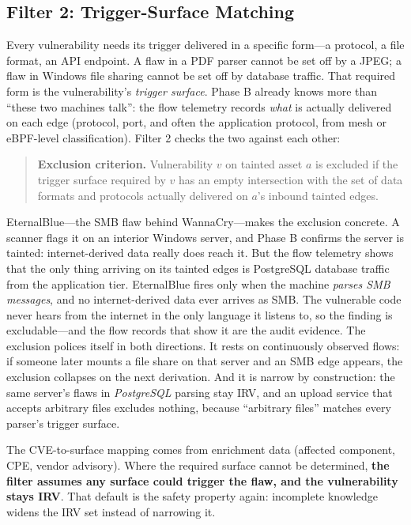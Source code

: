 \documentclass[11pt]{article}
\begin{document}
\subsection{Filter 2: Trigger-Surface Matching}
Every vulnerability needs its trigger delivered in a specific form---a protocol, a file format, an API endpoint. A flaw in a PDF parser cannot be set off by a JPEG; a flaw in Windows file sharing cannot be set off by database traffic. That required form is the vulnerability's \emph{trigger surface}. Phase B already knows more than ``these two machines talk'': the flow telemetry records \emph{what} is actually delivered on each edge (protocol, port, and often the application protocol, from mesh or eBPF-level classification). Filter 2 checks the two against each other:
\begin{quote}
\textbf{Exclusion criterion.} Vulnerability $v$ on tainted asset $a$ is excluded if the trigger surface required by $v$ has an empty intersection with the set of data formats and protocols actually delivered on $a$'s inbound tainted edges.
\end{quote}
EternalBlue---the SMB flaw behind WannaCry---makes the exclusion concrete. A scanner flags it on an interior Windows server, and Phase B confirms the server is tainted: internet-derived data really does reach it. But the flow telemetry shows that the only thing arriving on its tainted edges is PostgreSQL database traffic from the application tier. EternalBlue fires only when the machine \emph{parses SMB messages}, and no internet-derived data ever arrives as SMB. The vulnerable code never hears from the internet in the only language it listens to, so the finding is excludable---and the flow records that show it are the audit evidence. The exclusion polices itself in both directions. It rests on continuously observed flows: if someone later mounts a file share on that server and an SMB edge appears, the exclusion collapses on the next derivation. And it is narrow by construction: the same server's flaws in \emph{PostgreSQL} parsing stay IRV, and an upload service that accepts arbitrary files excludes nothing, because ``arbitrary files'' matches every parser's trigger surface.

The CVE-to-surface mapping comes from enrichment data (affected component, CPE, vendor advisory). Where the required surface cannot be determined, \textbf{the filter assumes any surface could trigger the flaw, and the vulnerability stays IRV}. That default is the safety property again: incomplete knowledge widens the IRV set instead of narrowing it.
\end{document}
